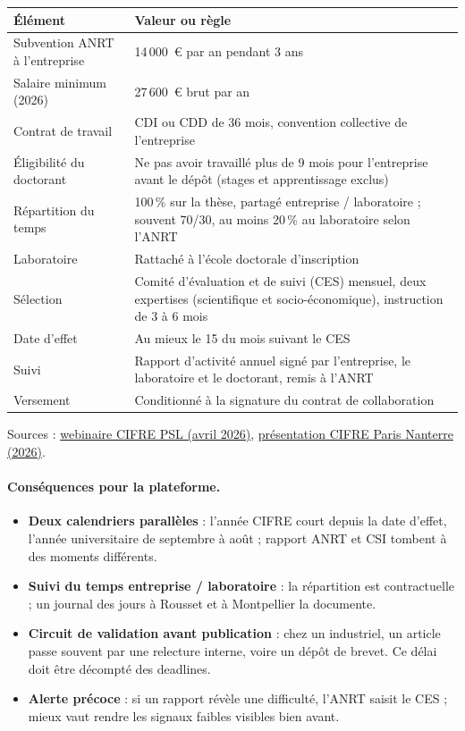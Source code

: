 \documentclass[11pt,a4paper]{article}
\begin{document}
\begin{center}\small
\begin{tabularx}{\linewidth}{P{4.2cm} L}
\toprule
\textbf{Élément} & \textbf{Valeur ou règle}\\
\midrule
Subvention ANRT à l'entreprise & 14\,000~€ par an pendant 3 ans\\
Salaire minimum (2026) & 27\,600~€ brut par an\\
Contrat de travail & CDI ou CDD de 36 mois, convention collective de l'entreprise\\
Éligibilité du doctorant & Ne pas avoir travaillé plus de 9 mois pour l'entreprise avant le dépôt (stages et apprentissage exclus)\\
Répartition du temps & 100\,\% sur la thèse, partagé entreprise / laboratoire ; souvent 70/30, au moins 20\,\% au laboratoire selon l'ANRT\\
Laboratoire & Rattaché à l'école doctorale d'inscription\\
Sélection & Comité d'évaluation et de suivi (CES) mensuel, deux expertises (scientifique et socio-économique), instruction de 3 à 6 mois\\
Date d'effet & Au mieux le 15 du mois suivant le CES\\
Suivi & Rapport d'activité annuel signé par l'entreprise, le laboratoire et le doctorant, remis à l'ANRT\\
Versement & Conditionné à la signature du contrat de collaboration\\
\bottomrule
\end{tabularx}
\end{center}

\noindent Sources :
\href{https://static.psl.eu/sites/default/files/2026-07/Webinaire\%20CIFRE\%20COFRA\%2007.04.26.pdf}{webinaire CIFRE PSL (avril 2026)},
\href{https://ed-lls.parisnanterre.fr/medias/fichier/presentation-cifre-cofra_1776946105660-pdf}{présentation CIFRE Paris Nanterre (2026)}.

\paragraph{Conséquences pour la plateforme.}
\begin{itemize}
  \item \textbf{Deux calendriers parallèles} : l'année CIFRE court depuis la date
  d'effet, l'année universitaire de septembre à août ; rapport ANRT et CSI tombent à
  des moments différents.
  \item \textbf{Suivi du temps entreprise / laboratoire} : la répartition est
  contractuelle ; un journal des jours à Rousset et à Montpellier la documente.
  \item \textbf{Circuit de validation avant publication} : chez un industriel, un
  article passe souvent par une relecture interne, voire un dépôt de brevet. Ce
  délai doit être décompté des deadlines.
  \item \textbf{Alerte précoce} : si un rapport révèle une difficulté, l'ANRT saisit le
  CES ; mieux vaut rendre les signaux faibles visibles bien avant.
\end{itemize}
\end{document}
